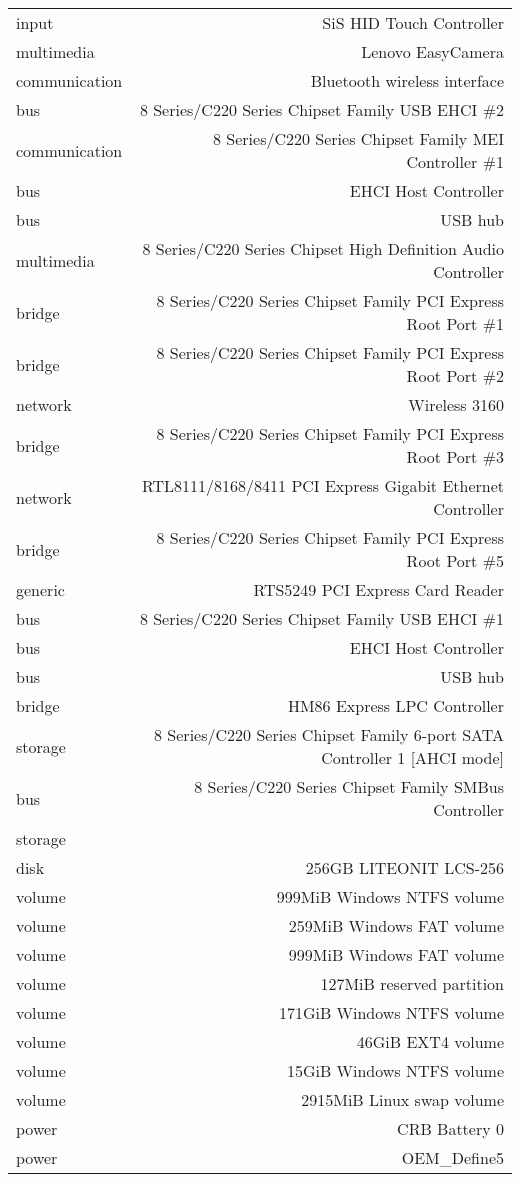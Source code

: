\begin{table}
\begin{center}
\begin{tabular}{l | r }
 input         &  SiS HID Touch Controller  \\
 multimedia    &  Lenovo EasyCamera \\
 communication &  Bluetooth wireless interface  \\
 bus           &  8 Series/C220 Series Chipset Family USB EHCI \#2   \\
 communication &  8 Series/C220 Series Chipset Family MEI Controller \#1 \\
 bus           &  EHCI Host Controller  \\
 bus           &  USB hub   \\
 multimedia    &  8 Series/C220 Series Chipset High Definition Audio Controller \\
 bridge        &  8 Series/C220 Series Chipset Family PCI Express Root Port \#1  \\
 bridge        &  8 Series/C220 Series Chipset Family PCI Express Root Port \#2  \\
 network       &  Wireless 3160 \\
 bridge        &  8 Series/C220 Series Chipset Family PCI Express Root Port \#3  \\
 network       &  RTL8111/8168/8411 PCI Express Gigabit Ethernet Controller \\
 bridge        &  8 Series/C220 Series Chipset Family PCI Express Root Port \#5  \\
 generic       &  RTS5249 PCI Express Card Reader   \\
 bus           &  8 Series/C220 Series Chipset Family USB EHCI \#1   \\
 bus           &  EHCI Host Controller  \\
 bus           &  USB hub   \\
 bridge        &  HM86 Express LPC Controller   \\
 storage       &  8 Series/C220 Series Chipset Family 6-port SATA Controller 1 [AHCI mode]  \\
 bus           &  8 Series/C220 Series Chipset Family SMBus Controller  \\
 storage       &  \\
 disk          &  256GB LITEONIT LCS-256    \\
 volume        &  999MiB Windows NTFS volume    \\
 volume        &  259MiB Windows FAT volume \\
 volume        &  999MiB Windows FAT volume \\
 volume        &  127MiB reserved partition \\
 volume        &  171GiB Windows NTFS volume    \\
 volume        &  46GiB EXT4 volume \\
 volume        &  15GiB Windows NTFS volume \\
 volume        &  2915MiB Linux swap volume \\
 power         &  CRB Battery 0 \\
 power         &  OEM\_Define5   \\


\end{tabular}
\end{center}
\end{table}
